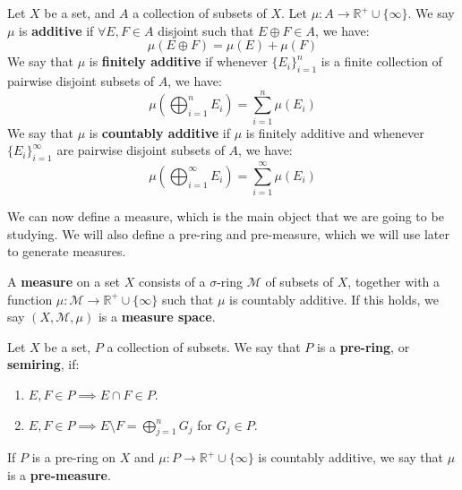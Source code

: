 	\begin{definition}
		Let $X$ be a set, and $A$ a collection of subsets of $X$. Let $\mu : A\rightarrow\mathbb R^+\cup\{\infty\}$. We say 
		$\mu$ is \textbf{additive} if $\forall E, F\in A$ disjoint such that $E\oplus F\in A$, we have:
		$$
			\mu(E\oplus F) = \mu(E) + \mu(F)
		$$
		We say that $\mu$ is \textbf{finitely additive} if whenever $\{E_i\}_{i = 1}^n$ is a finite collection of pairwise disjoint 
		subsets of $A$, we have:
		$$
			\mu \left( \bigoplus_{i = 1}^n E_i \right) = \sum_{i = 1}^n\mu(E_i)
		$$
		We say that $\mu$ is \textbf{countably additive} if $\mu$ is finitely additive and whenever $\{E_i\}_{i = 1}^\infty$ are 
		pairwise disjoint subsets of $A$, we have:
		$$
			\mu \left(\bigoplus_{i = 1}^\infty E_i \right) = \sum_{i = 1}^\infty\mu(E_i)
		$$
	\end{definition}
	
	We can now define a measure, which is the main object that we are going to be studying. We will also define a pre-ring 
	and pre-measure, which we will use later to generate measures.
	
	\begin{definition}[Measure]
		A \textbf{measure} on a set $X$ consists of a $\sigma$-ring $\mathcal M$ of subsets of $X$, together with a 
		function $\mu : \mathcal M\rightarrow\mathbb R^+\cup\{\infty\}$ such that $\mu$ is countably additive. If this holds, 
		we say $(X, \mathcal M, \mu)$ is a \textbf{measure space}.
	\end{definition}
	
	\begin{definition}
		Let $X$ be a set, $P$ a collection of subsets. We say that $P$ is a \textbf{pre-ring}, or \textbf{semiring}, if:
		\begin{enumerate}
			\item $E, F\in P\implies E\cap F\in P$. 
			\item $E, F\in P\implies E\setminus F = \bigoplus_{j = 1}^n G_j$ for $G_j\in P$. 
		\end{enumerate}
		If $P$ is a pre-ring on $X$ and $\mu : P\rightarrow\mathbb R^+\cup\{\infty\}$ is countably additive, we say that 
		$\mu$ is a \textbf{pre-measure}.
	\end{definition}
	
